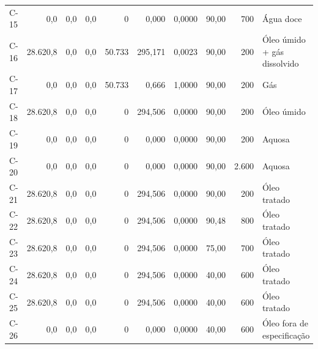 \documentclass[11pt,a4paper]{article}
\numberwithin{equation}{section}
\numberwithin{table}{section}
\numberwithin{figure}{section}
\begin{document}
{\begin{longtable}{lrrrrrrrrL{2.5cm}}
C-15 & 0,0 & 0,0 & 0,0 & 0 & 0,000 & 0,0000 & 90,00 & 700 & {\scriptsize Água doce}\\
C-16 & 28.620,8 & 0,0 & 0,0 & 50.733 & 295,171 & 0,0023 & 90,00 & 200 & {\scriptsize Óleo úmido + gás dissolvido}\\
C-17 & 0,0 & 0,0 & 0,0 & 50.733 & 0,666 & 1,0000 & 90,00 & 200 & {\scriptsize Gás}\\
C-18 & 28.620,8 & 0,0 & 0,0 & 0 & 294,506 & 0,0000 & 90,00 & 200 & {\scriptsize Óleo úmido}\\
C-19 & 0,0 & 0,0 & 0,0 & 0 & 0,000 & 0,0000 & 90,00 & 200 & {\scriptsize Aquosa}\\
C-20 & 0,0 & 0,0 & 0,0 & 0 & 0,000 & 0,0000 & 90,00 & 2.600 & {\scriptsize Aquosa}\\
C-21 & 28.620,8 & 0,0 & 0,0 & 0 & 294,506 & 0,0000 & 90,00 & 200 & {\scriptsize Óleo tratado}\\
C-22 & 28.620,8 & 0,0 & 0,0 & 0 & 294,506 & 0,0000 & 90,48 & 800 & {\scriptsize Óleo tratado}\\
C-23 & 28.620,8 & 0,0 & 0,0 & 0 & 294,506 & 0,0000 & 75,00 & 700 & {\scriptsize Óleo tratado}\\
C-24 & 28.620,8 & 0,0 & 0,0 & 0 & 294,506 & 0,0000 & 40,00 & 600 & {\scriptsize Óleo tratado}\\
C-25 & 28.620,8 & 0,0 & 0,0 & 0 & 294,506 & 0,0000 & 40,00 & 600 & {\scriptsize Óleo tratado}\\
C-26 & 0,0 & 0,0 & 0,0 & 0 & 0,000 & 0,0000 & 40,00 & 600 & {\scriptsize Óleo fora de especificação}\\
\bottomrule\end{longtable}}
\end{document}
